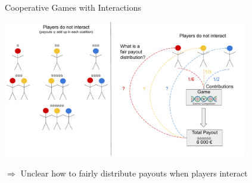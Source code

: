 \documentclass[11pt,compress,t,notes=noshow, aspectratio=169, xcolor=table]{beamer}
\begin{document}



\begin{frame}{Cooperative Games with Interactions}
\begin{center}
\includegraphics[page=3, width = 0.8\textwidth]{figure/Shapley.pdf}

$\Rightarrow$ Unclear how to fairly distribute payouts when players interact
\end{center}
\end{frame}
\end{document}
